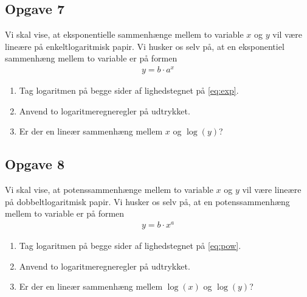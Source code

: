 \subsection*{Opgave 7}
Vi skal vise, at eksponentielle sammenhænge mellem to variable $x$ og $y$ vil være lineære på enkeltlogaritmisk papir. Vi husker os selv på, at en eksponentiel sammenhæng mellem to variable er på formen
\begin{align}
	\label{eq:exp}
	y = b\cdot a^x
\end{align}
\begin{enumerate}[label=\roman*)]
	\item Tag logaritmen på begge sider af lighedstegnet på \eqref{eq:exp}.
	\item Anvend to logaritmeregneregler på udtrykket.
	\item Er der en lineær sammenhæng mellem $x$ og $\log(y)$?
\end{enumerate}

\subsection*{Opgave 8}
Vi skal vise, at potenssammenhænge mellem to variable $x$ og $y$ vil være lineære på dobbeltlogaritmisk papir. Vi husker os selv på, at en potenssammenhæng mellem to variable er på formen
\begin{align}
	\label{eq:pow}
	y = b\cdot x^a
\end{align}
\begin{enumerate}[label=\roman*)]
	\item Tag logaritmen på begge sider af lighedstegnet på \eqref{eq:pow}.
	\item Anvend to logaritmeregneregler på udtrykket.
	\item Er der en lineær sammenhæng mellem $\log(x)$ og $\log(y)$?
\end{enumerate}

